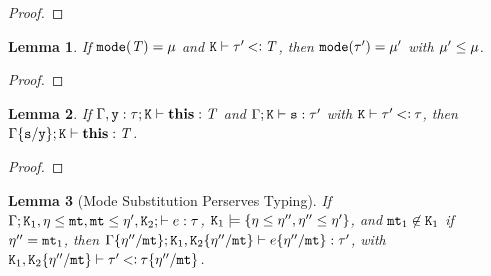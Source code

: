 \documentclass[onecolumn,nocopyrightspace]{sigplanconf}
\newtheorem{lemma}{Lemma}
\theoremstyle{lessintrusive}
\theoremstyle{plain}
\theoremstyle{custom}
\begin{document}
\begin{proof}
\end{proof} 

\begin{lemma}
\label{pf:fmode-subtypes}
If $\mathtt{mode}(\mathit{T}) = \mu$ and $\mathtt{K}\vdash\tau'\mathbin{<\vcentcolon}\mathit{T}$, then $\mathtt{mode}(\tau') = \mu'$ with $\mu'\leq\mu$.
\end{lemma}

\begin{proof}
\end{proof} 

\begin{lemma}
\label{pf:this-fixed}
If $\Gamma,\mathtt{y}:\tau;\mathtt{K} \vdash \texttt{\bf this}:\mathit{T}$ and $\Gamma;\mathtt{K} \vdash \mathtt{s}:\tau'$ with $\mathtt{K} \vdash \tau' \mathbin{<\vcentcolon} \tau$, then $\Gamma\{\mathtt{s}/\mathtt{y}\};\mathtt{K} \vdash \texttt{\bf this}:\mathit{T}$.
\end{lemma}

\begin{proof}
\end{proof}

\begin{lemma}[Mode Substitution Perserves Typing]
\label{pf:modesubstitution-preserves-typing}
If $\Gamma;\mathtt{K}_{1},\eta\leq\mathtt{mt},\mathtt{mt}\leq\eta',\mathtt{K}_{2};\vdash e:\tau$, $\mathtt{K}_{1}\models\{\eta\leq\eta'',\eta''\leq\eta'\}$, and $\mathtt{mt}_{1} \not\in \mathtt{K}_{1}$ if $\eta'' = \mathtt{mt}_{1}$, then $\Gamma\{\eta''/\mathtt{mt}\};\mathtt{K}_{1},\mathtt{K}_{2}\{\eta''/\mathtt{mt}\}\vdash e\{\eta''/\mathtt{mt}\}:\tau'$, with $\mathtt{K}_{1},\mathtt{K}_{2}\{\eta''/\mathtt{mt}\}\vdash\tau'\mathbin{<\vcentcolon}\tau\{\eta''/\mathtt{mt}\}$.
\end{lemma}
\end{document}

